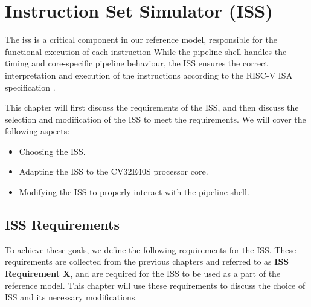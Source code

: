\chapter{Instruction Set Simulator (ISS)}
\label{ch:ISS}


The \acrfull{iss} is a critical component in our reference model, responsible for the functional execution of each instruction While the pipeline shell handles the timing and core-specific pipeline behaviour, the ISS ensures the correct interpretation and execution of the instructions according to the RISC-V ISA specification \cite{watermanRISCVInstructionSet2019, watermanRISCVInstructionSet2021}.

This chapter will first discuss the requirements of the ISS, and then discuss the selection and modification of the ISS to meet the requirements. 
We will cover the following aspects:

\begin{itemize}
    \item Choosing the ISS.
    \item Adapting the ISS to the CV32E40S processor core.
    \item Modifying the ISS to properly interact with the pipeline shell.
\end{itemize}

\section{ISS Requirements}

To achieve these goals, we define the following requirements for the ISS. These requirements are collected from the previous chapters and referred to as \textbf{ISS Requirement X}, and are required for the ISS to be used as a part of the reference model. This chapter will use these requirements to discuss the choice of ISS and its necessary modifications. 

